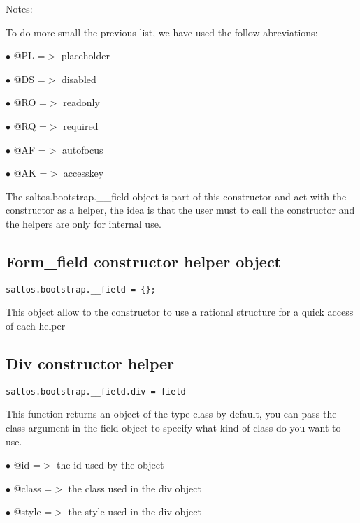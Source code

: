 \documentclass[a4paper]{book}
\begin{document}
Notes:

To do more small the previous list, we have used the follow abreviations:

\begin{compactitem}
\item[\color{myblue}$\bullet$] @PL =$>$ placeholder
\item[\color{myblue}$\bullet$] @DS =$>$ disabled
\item[\color{myblue}$\bullet$] @RO =$>$ readonly
\item[\color{myblue}$\bullet$] @RQ =$>$ required
\item[\color{myblue}$\bullet$] @AF =$>$ autofocus
\item[\color{myblue}$\bullet$] @AK =$>$ accesskey
\end{compactitem}

The saltos.bootstrap.\_\_field object is part of this constructor and act with the constructor
as a helper, the idea is that the user must to call the constructor and the helpers are
only for internal use.

\hypertarget{toc455}{}
\subsection{Form\_field constructor helper object}

\begin{lstlisting}
saltos.bootstrap.__field = {};
\end{lstlisting}

This object allow to the constructor to use a rational structure for a quick access of each helper

\hypertarget{toc456}{}
\subsection{Div constructor helper}

\begin{lstlisting}
saltos.bootstrap.__field.div = field
\end{lstlisting}

This function returns an object of the type class by default, you can pass the class
argument in the field object to specify what kind of class do you want to use.

\begin{compactitem}
\item[\color{myblue}$\bullet$] @id    =$>$ the id used by the object
\item[\color{myblue}$\bullet$] @class =$>$ the class used in the div object
\item[\color{myblue}$\bullet$] @style =$>$ the style used in the div object
\end{compactitem}
\end{document}
